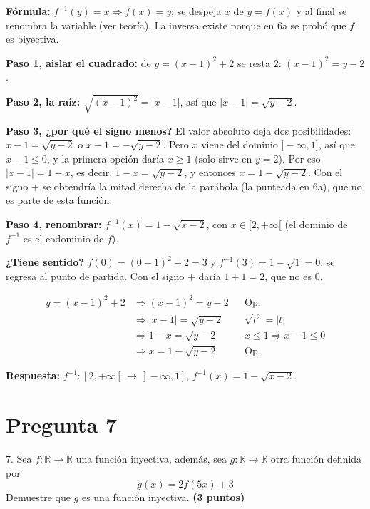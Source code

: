 \documentclass[11pt]{article}
\newcommand{\hl}[1]{\colorbox{green!35}{#1}}
\begin{document}
\begin{explica}
\textbf{Fórmula:} $f^{-1}(y)=x\iff f(x)=y$; se despeja $x$ de $y=f(x)$ y al final se renombra la variable (ver teoría). La inversa existe porque en 6a se probó que $f$ es biyectiva.

\textbf{Paso 1, aislar el cuadrado:} de $y=(x-1)^2+2$ se resta $2$: $(x-1)^2=y-2$.

\textbf{Paso 2, la raíz:} $\sqrt{(x-1)^2}=|x-1|$, así que $|x-1|=\sqrt{y-2}$.

\textbf{Paso 3, ¿por qué el signo menos?} El valor absoluto deja dos posibilidades: $x-1=\sqrt{y-2}$ o $x-1=-\sqrt{y-2}$. Pero $x$ viene del dominio $]-\infty,1]$, así que $x-1\le0$, y la primera opción daría $x\ge1$ (solo sirve en $y=2$). Por eso $|x-1|=1-x$, es decir, $1-x=\sqrt{y-2}$, y entonces $x=1-\sqrt{y-2}$. Con el signo $+$ se obtendría la mitad derecha de la parábola (la punteada en 6a), que no es parte de esta función.

\textbf{Paso 4, renombrar:} $f^{-1}(x)=1-\sqrt{x-2}$, con $x\in[2,+\infty[$ (el dominio de $f^{-1}$ es el codominio de $f$).

\textbf{¿Tiene sentido?} $f(0)=(0-1)^2+2=3$ y $f^{-1}(3)=1-\sqrt{1}=0$: se regresa al punto de partida. Con el signo $+$ daría $1+1=2$, que no es $0$.
\end{explica}

\begin{align*}
y=(x-1)^2+2 &\Rightarrow (x-1)^2=y-2 && \text{Op.}\\
&\Rightarrow |x-1|=\sqrt{y-2} && \sqrt{t^2}=|t|\\
&\Rightarrow 1-x=\sqrt{y-2} && x\le1\Rightarrow x-1\le0\\
&\Rightarrow x=1-\sqrt{y-2} && \text{Op.}
\end{align*}

\textbf{Respuesta:} $f^{-1}:[2,+\infty[\,\to\,]-\infty,1]$, $f^{-1}(x)=1-\sqrt{x-2}$.

\clearpage
\section*{Pregunta 7}

7. Sea $f:\mathbb R\longrightarrow\mathbb R$ una función \hl{inyectiva}, además, sea $g:\mathbb R\longrightarrow\mathbb R$ otra función definida por
\[ g(x)=2f(5x)+3 \]
Demuestre que \hl{$g$ es una función inyectiva}. \hfill\textbf{(3 puntos)}
\end{document}
